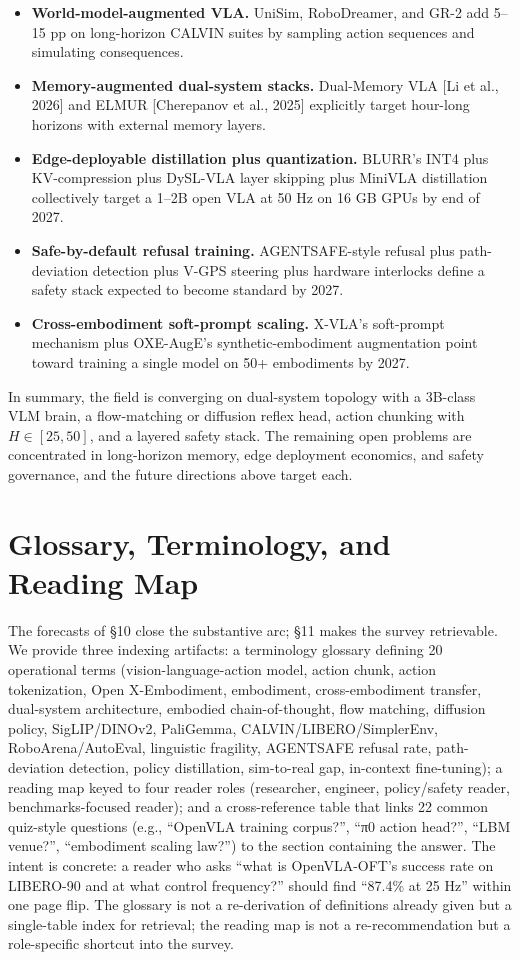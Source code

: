 \begin{itemize}
\tightlist
\item
  \textbf{World-model-augmented VLA.} UniSim, RoboDreamer, and GR-2 add 5--15 pp on long-horizon CALVIN suites by sampling action sequences and simulating consequences.
\item
  \textbf{Memory-augmented dual-system stacks.} Dual-Memory VLA {[}Li et al., 2026{]} and ELMUR {[}Cherepanov et al., 2025{]} explicitly target hour-long horizons with external memory layers.
\item
  \textbf{Edge-deployable distillation plus quantization.} BLURR's INT4 plus KV-compression plus DySL-VLA layer skipping plus MiniVLA distillation collectively target a 1--2B open VLA at 50 Hz on 16 GB GPUs by end of 2027.
\item
  \textbf{Safe-by-default refusal training.} AGENTSAFE-style refusal plus path-deviation detection plus V-GPS steering plus hardware interlocks define a safety stack expected to become standard by 2027.
\item
  \textbf{Cross-embodiment soft-prompt scaling.} X-VLA's soft-prompt mechanism plus OXE-AugE's synthetic-embodiment augmentation point toward training a single model on 50+ embodiments by 2027.
\end{itemize}

In summary, the field is converging on dual-system topology with a 3B-class VLM brain, a flow-matching or diffusion reflex head, action chunking with \(H \in [25, 50]\), and a layered safety stack. The remaining open problems are concentrated in long-horizon memory, edge deployment economics, and safety governance, and the future directions above target each.

\section{Glossary, Terminology, and Reading Map}\label{glossary-terminology-and-reading-map}

The forecasts of §10 close the substantive arc; §11 makes the survey retrievable. We provide three indexing artifacts: a terminology glossary defining 20 operational terms (vision-language-action model, action chunk, action tokenization, Open X-Embodiment, embodiment, cross-embodiment transfer, dual-system architecture, embodied chain-of-thought, flow matching, diffusion policy, SigLIP/DINOv2, PaliGemma, CALVIN/LIBERO/SimplerEnv, RoboArena/AutoEval, linguistic fragility, AGENTSAFE refusal rate, path-deviation detection, policy distillation, sim-to-real gap, in-context fine-tuning); a reading map keyed to four reader roles (researcher, engineer, policy/safety reader, benchmarks-focused reader); and a cross-reference table that links 22 common quiz-style questions (e.g., ``OpenVLA training corpus?'', ``π0 action head?'', ``LBM venue?'', ``embodiment scaling law?'') to the section containing the answer. The intent is concrete: a reader who asks ``what is OpenVLA-OFT's success rate on LIBERO-90 and at what control frequency?'' should find ``87.4\% at 25 Hz'' within one page flip. The glossary is not a re-derivation of definitions already given but a single-table index for retrieval; the reading map is not a re-recommendation but a role-specific shortcut into the survey.

